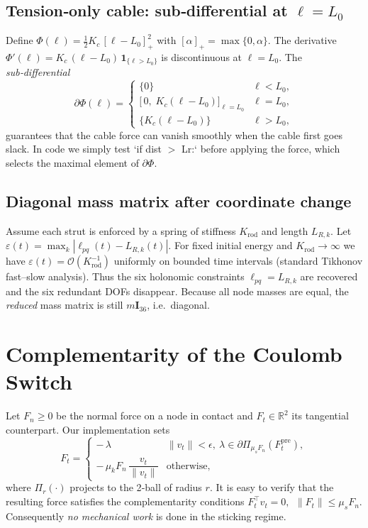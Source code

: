 \documentclass[12pt,letterpaper]{article}
\newcommand{\R}{\mathbb{R}}
\begin{document}
\subsection{Tension‑only cable: sub‑differential at $\ell=L_{0}$}

Define $\Phi(\ell)=\tfrac12K_c\,[\ell-L_0]_+^{2}$ with
$[\alpha]_+=\max\{0,\alpha\}$.
The derivative
\(
    \Phi'(\ell)=
    K_c\,(\ell-L_0)\,\mathbf 1_{\{\ell>L_0\}}
\)
is discontinuous at $\ell=L_0$.  The \emph{sub‑differential}
\[
    \partial\Phi(\ell)=
    \begin{cases}
        \{0\}                                   & \ell<L_0,\\
        \bigl[\,0,\;K_c(\ell-L_0)\bigr]_{\ell=L_0} & \ell=L_0,\\
        \{K_c(\ell-L_0)\}                       & \ell>L_0,
    \end{cases}
\]
guarantees that the cable force can vanish smoothly when the cable first
goes slack.  In code we simply test `if dist $>$ Lr:` before applying the
force, which selects the maximal element of $\partial\Phi$.

\subsection{Diagonal mass matrix after coordinate change}
\label{sec:holonomic-limit}

Assume each strut is enforced by a spring of stiffness $K_{\text{rod}}$
and length $L_{R,k}$.
Let $\varepsilon(t)=\max_k|\ell_{pq}(t)-L_{R,k}(t)|$.
For fixed initial energy and $K_{\text{rod}}\!\to\!\infty$ we have
$\varepsilon(t)=\mathcal O(K_{\text{rod}}^{-1})$ uniformly on bounded
time intervals (standard Tikhonov fast–slow analysis).
Thus the six holonomic constraints $\ell_{pq}=L_{R,k}$ are recovered
and the six redundant DOFs disappear.
Because all node masses are equal, the \emph{reduced} mass matrix is still
$m\mathbf I_{36}$, i.e.\ diagonal.

\section{Complementarity of the Coulomb Switch}
\label{sec:friction-proof}

Let $F_n\ge0$ be the normal force on a node in contact and
$F_t\in\R^2$ its tangential counterpart.
Our implementation sets
\[
    F_t =
    \begin{cases}
      -\,\lambda & \|v_t\|<\epsilon,~
                   \lambda\in\partial\Pi_{\mu_s F_n}(F^{\mathrm{pre}}_t),\\
      -\,\mu_k F_n\,\dfrac{v_t}{\|v_t\|} & \text{otherwise},
    \end{cases}
\]
where $\Pi_{r}( \cdot)$ projects to the 2‑ball of radius $r$.
It is easy to verify that the resulting force satisfies the
complementarity conditions
\(
    F_t^{\top}v_t = 0,~~
    \|F_t\|\le\mu_s F_n.
\)
Consequently \emph{no mechanical work} is done in the sticking regime.
\end{document}

